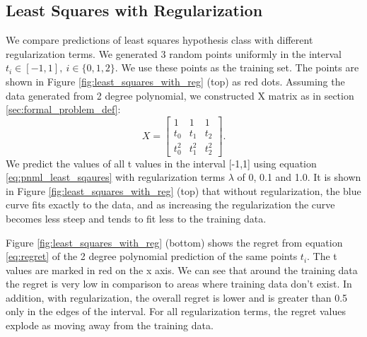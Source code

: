 \documentclass[conference,letterpaper]{IEEEtran}
\begin{document}
\subsection{Least Squares with Regularization} \label{sec:least_sqaures_with_reg}
We compare predictions of least squares hypothesis class with different regularization terms.
We generated 3 random points uniformly in the interval $t_i \in [-1, 1],\ i \in \{0,1,2\}$. We use these points as the training set. 
The points are shown in Figure \ref{fig:least_squares_with_reg} (top) as red dots. 
Assuming the data generated from 2 degree polynomial, we constructed X matrix as in section \ref{sec:formal_problem_def}:
\begin{equation}
X = 
\begin{bmatrix}
1 & 1 & 1 \\
t_0 & t_1 & t_2 \\
t_0^2 & t_1^2 & t_2^2 
\end{bmatrix}.
\end{equation}
We predict the values of all t values in the interval [-1,1] using equation \ref{eq:pnml_least_sqaures} with regularization terms $\lambda$ of 0, 0.1 and 1.0. 
It is shown in Figure \ref{fig:least_squares_with_reg} (top) that without regularization, the blue curve fits exactly to the data, and as increasing the regularization the curve becomes less steep and tends to fit less to the training data.

Figure \ref{fig:least_squares_with_reg} (bottom) shows the regret from equation \ref{eq:regret} of the 2 degree polynomial prediction of the same points $t_i$. 
The t values are marked in red on the x axis. 
We can see that around the training data the regret is very low in comparison to areas where training data don't exist. 
In addition, with regularization, the overall regret is lower and is greater than 0.5 only in the edges of the interval.
For all regularization terms, the regret values explode as moving away from the training data.
\end{document}
